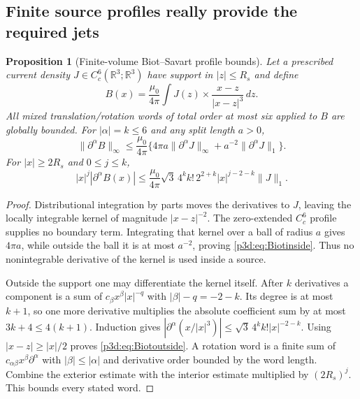 \documentclass[11pt]{article}
\numberwithin{equation}{section}
\newtheorem{proposition}[theorem]{Proposition}
\theoremstyle{definition}
\theoremstyle{remark}
\begin{document}
\subsection{Finite source profiles really provide the required jets}
\label{p3d:sec:profiles}

\begin{proposition}[Finite-volume Biot--Savart profile bounds]
\label{p3d:prop:profiles}
Let a prescribed current density $J\in C_c^6(\mathbb R^3;\mathbb R^3)$
have support in $|z|\leq R_s$ and define
\[
 B(x)=\frac{\mu_0}{4\pi}\int J(z)\times
                     \frac{x-z}{|x-z|^3}\,dz .
\]
All mixed translation/rotation words of total order at most six applied
to $B$ are globally bounded. For $|\alpha|=k\leq6$ and any split
length $a>0$,
\begin{equation}\label{p3d:eq:Biotinside}
 \|\partial^\alpha B\|_\infty\leq
 \frac{\mu_0}{4\pi}
 \{4\pi a\|\partial^\alpha J\|_\infty
                         +a^{-2}\|\partial^\alpha J\|_1\}.
\end{equation}
For $|x|\geq2R_s$ and $0\leq j\leq k$,
\begin{equation}\label{p3d:eq:Biotoutside}
 |x|^j|\partial^\alpha B(x)|
 \leq\frac{\mu_0}{4\pi}\sqrt3\,4^kk!\,2^{2+k}
                  |x|^{j-2-k}\|J\|_1 .
\end{equation}
\end{proposition}
\begin{proof}
Distributional integration by parts moves the derivatives to $J$,
leaving the locally integrable kernel of magnitude $|x-z|^{-2}$.
The zero-extended $C_c^6$ profile supplies no boundary term. Integrating
that kernel over a ball of radius $a$ gives $4\pi a$, while outside
the ball it is at most $a^{-2}$, proving \eqref{p3d:eq:Biotinside}.
Thus no nonintegrable derivative of the kernel is used inside a source.

Outside the support one may differentiate the kernel itself.
After $k$ derivatives a component is a sum of
$c_\beta x^\beta|x|^{-q}$ with $|\beta|-q=-2-k$.
Its degree is at most $k+1$, so one more derivative multiplies the
absolute coefficient sum by at most $3k+4\leq4(k+1)$.
Induction gives
$|\partial^\alpha(x/|x|^3)|\leq\sqrt3\,4^kk!|x|^{-2-k}$.
Using $|x-z|\geq|x|/2$ proves \eqref{p3d:eq:Biotoutside}.
A rotation word is a finite sum of
$c_{\alpha\beta}x^\beta\partial^\alpha$ with
$|\beta|\leq|\alpha|$ and derivative order bounded by the word length.
Combine the exterior estimate with the interior estimate multiplied by
$(2R_s)^j$. This bounds every stated word.
\end{proof}
\end{document}
